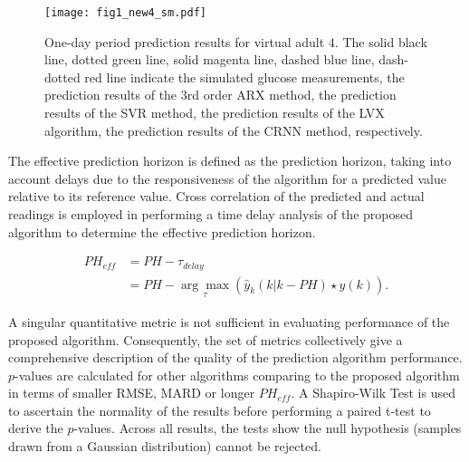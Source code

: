 \documentclass[a4paper, 10 pt, twocolumn]{IEEEtran}
\begin{document}
\begin{figure*}[!ht]
     \centering
             \texttt{[image: fig1\_new4\_sm.pdf]}
             \caption{One-day period prediction results for virtual adult $4$. The solid black line, dotted green line, solid magenta line, dashed blue line, dash-dotted red line indicate the simulated glucose
             measurements, the prediction results of the 3rd order ARX method, the prediction results of the SVR method, the prediction results of the LVX algorithm, the prediction results of the CRNN method,
             respectively. }
             \label{fig:C1}
\end{figure*}

The effective prediction horizon is defined as the prediction horizon, taking into account delays due to the responsiveness of the algorithm for a predicted value relative to its reference value. Cross correlation of the
predicted and actual readings is employed in performing a time delay analysis of the proposed algorithm to determine the effective prediction horizon.

\begin{equation}\label{eq:Delay}
\begin{split}
PH_{eff} &= PH - \tau_{delay} \\
         &= PH - \underset{\tau}{\arg\max} (\hat{y}_k(k|k-PH) \star y(k)).
\end{split}
\end{equation}

A singular quantitative metric is not sufficient in evaluating performance of the proposed algorithm. Consequently, the set of metrics collectively give a comprehensive description of the quality of the prediction
algorithm performance.
 {$p$-values are calculated for other algorithms comparing to the proposed algorithm in terms of smaller RMSE, MARD or longer $PH_{eff}$. A Shapiro-Wilk Test is used to ascertain the normality of the results before
 performing a paired t-test to derive the $p$-values. Across all results, the tests show the null hypothesis (samples drawn from a Gaussian distribution) cannot be rejected.}
\end{document}
